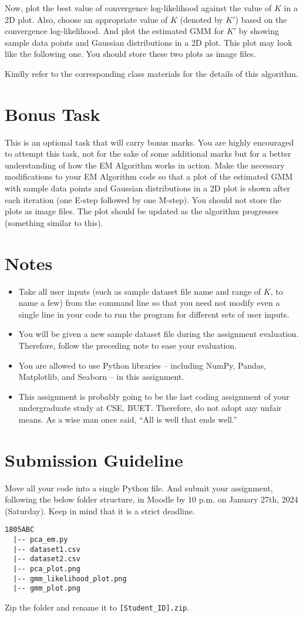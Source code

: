 \documentclass[11pt, a4paper]{article}
\begin{document}
Now, plot the best value of convergence log-likelihood against the value of $K$ in a 2D plot. Also, choose an appropriate value of $K$ (denoted by $K'$) based on the convergence log-likelihood. And plot the estimated GMM for $K'$ by showing sample data points and Gaussian distributions in a 2D plot. This plot may look like the following one. You should store these two plots as image files.

Kindly refer to the corresponding class materials for the details of this algorithm.

\section{Bonus Task}
This is an optional task that will carry bonus marks. You are highly encouraged to attempt this task, not for the sake of some additional marks but for a better understanding of how the EM Algorithm works in action. Make the necessary modifications to your EM Algorithm code so that a plot of the estimated GMM with sample data points and Gaussian distributions in a 2D plot is shown after each iteration (one E-step followed by one M-step). You should not store the plots as image files. The plot should be updated as the algorithm progresses (something similar to this).

\section{Notes}
\begin{itemize}
    \item Take all user inputs (such as sample dataset file name and range of $K$, to name a few) from the command line so that you need not modify even a single line in your code to run the program for different sets of user inputs.
    \item You will be given a new sample dataset file during the assignment evaluation. Therefore, follow the preceding note to ease your evaluation.
    \item You are allowed to use Python libraries -- including NumPy, Pandas, Matplotlib, and Seaborn -- in this assignment.
    \item This assignment is probably going to be the last coding assignment of your undergraduate study at CSE, BUET. Therefore, do not adopt any unfair means. As a wise man once said, ``All is well that ends well.''
\end{itemize}

\section{Submission Guideline}
Move all your code into a single Python file. And submit your assignment, following the below folder structure, in Moodle by 10 p.m. on January 27th, 2024 (Saturday). Keep in mind that it is a strict deadline.

\begin{verbatim}
1805ABC
  |-- pca_em.py
  |-- dataset1.csv
  |-- dataset2.csv
  |-- pca_plot.png
  |-- gmm_likelihood_plot.png
  |-- gmm_plot.png
\end{verbatim}

Zip the folder and rename it to \texttt{[Student\_ID].zip}.
\end{document}
